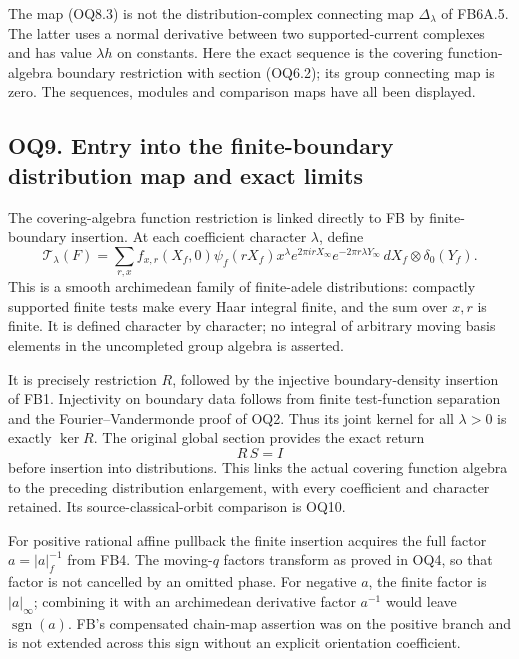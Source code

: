 The map (OQ8.3) is not the distribution-complex connecting map
\(\Delta_\lambda\) of FB6A.5. The latter uses a normal derivative
between two supported-current complexes and has value \(\lambda h\) on
constants. Here the exact sequence is the covering function-algebra
boundary restriction with section (OQ6.2); its group connecting map is
zero. The sequences, modules and comparison maps have all been
displayed.

\subsection{OQ9. Entry into the finite-boundary distribution map and
exact
limits}\label{oq9.-entry-into-the-finite-boundary-distribution-map-and-exact-limits}

The covering-algebra function restriction is linked directly to FB by
finite-boundary insertion. At each coefficient character \(\lambda\),
define \[
\mathcal T_\lambda(F)
=\sum_{r,x}
f_{x,r}(X_f,0)\psi_f(rX_f)x^\lambda
e^{2\pi irX_\infty}e^{-2\pi r\lambda Y_\infty}
\,dX_f\otimes\delta_0(Y_f).
\tag{OQ9.1}
\] This is a smooth archimedean family of finite-adele distributions:
compactly supported finite tests make every Haar integral finite, and
the sum over \(x,r\) is finite. It is defined character by character; no
integral of arbitrary moving basis elements in the uncompleted group
algebra is asserted.

It is precisely restriction \(R\), followed by the injective
boundary-density insertion of FB1. Injectivity on boundary data follows
from finite test-function separation and the Fourier--Vandermonde proof
of OQ2. Thus its joint kernel for all \(\lambda>0\) is exactly
\(\ker R\). The original global section provides the exact return \[
R\,S=I
\] before insertion into distributions. This links the actual covering
function algebra to the preceding distribution enlargement, with every
coefficient and character retained. Its source-classical-orbit
comparison is OQ10.

For positive rational affine pullback the finite insertion acquires the
full factor \(a=|a|_f^{-1}\) from FB4. The moving-\(q\) factors
transform as proved in OQ4, so that factor is not cancelled by an
omitted phase. For negative \(a\), the finite factor is \(|a|_\infty\);
combining it with an archimedean derivative factor \(a^{-1}\) would
leave \(\operatorname{sgn}(a)\). FB's compensated chain-map assertion
was on the positive branch and is not extended across this sign without
an explicit orientation coefficient.

